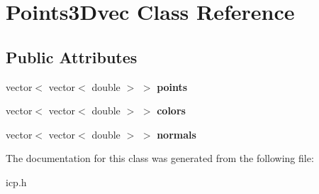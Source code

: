 \hypertarget{classPoints3Dvec}{}\section{Points3\+Dvec Class Reference}
\label{classPoints3Dvec}
\subsection*{Public Attributes}
\begin{DoxyCompactItemize}
\item 
\mbox{\label{classPoints3Dvec_a659839ac91974126c56a70aa3b4fe731}} 
vector$<$ vector$<$ double $>$ $>$ {\bfseries points}
\item 
\mbox{\label{classPoints3Dvec_ac92388c47ebc7f0043cab6b389d9a8ce}} 
vector$<$ vector$<$ double $>$ $>$ {\bfseries colors}
\item 
\mbox{\label{classPoints3Dvec_a391c4f2145e07c11dbd6ac026ffc402c}} 
vector$<$ vector$<$ double $>$ $>$ {\bfseries normals}
\end{DoxyCompactItemize}


The documentation for this class was generated from the following file\+:\begin{DoxyCompactItemize}
\item 
icp.\+h\end{DoxyCompactItemize}
